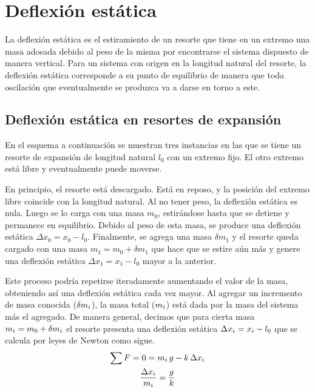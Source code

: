 \documentclass[a5paper,12pt,twoside]{book}
\begin{document}
\section{Deflexión estática}

La deflexión estática es el estiramiento de un resorte que tiene en un extremo una masa adosada debido al peso de la misma por encontrarse el sistema dispuesto de manera vertical.
Para un sistema con origen en la longitud natural del resorte, la deflexión estática corresponde a su punto de equilibrio de manera que toda oscilación que eventualmente se produzca va a darse en torno a este.


\subsection*{Deflexión estática en resortes de expansión}

En el esquema a continuación se muestran tres instancias en las que se tiene un resorte de expansión de longitud natural $l_0$ con un extremo fijo.
El otro extremo está libre y eventualmente puede moverse.

\begin{center}
    \def\svgwidth{0.8\linewidth}
    
\end{center}

En principio, el resorte está descargado.
Está en reposo, y la posición del extremo libre coincide con la longitud natural.
Al no tener peso, la deflexión estática es nula.
Luego se lo carga con una masa $m_0$, estirándose hasta que se detiene y permanece en equilibrio.
Debido al peso de esta masa, se produce una deflexión estática $\Delta x_0=x_0-l_0$.
Finalmente, se agrega una masa $\delta m_1$ y el resorte queda cargado con una masa $m_1=m_0+\delta m_1$ que hace que se estire aún más y genere una deflexión estática $\Delta x_1=x_1-l_0$ mayor a la anterior.

Este proceso podría repetirse iteradamente aumentando el valor de la masa, obteniendo así una deflexión estática cada vez mayor.
Al agregar un incremento de masa conocida ($\delta m_i$), la masa total ($m_i$) está dada por la masa del sistema más el agregado.
De manera general, decimos que para cierta masa $m_i=m_0+\delta m_i$ el resorte presenta una deflexión estática $\Delta x_i=x_i-l_0$ que se calcula por leyes de Newton como sigue.
\begin{gather*}
    \sum F = 0 = m_i \, g - k \, \Delta x_i
    \\
    \frac{\Delta x_i}{m_i} = \frac{g}{k}
\end{gather*}
\end{document}
